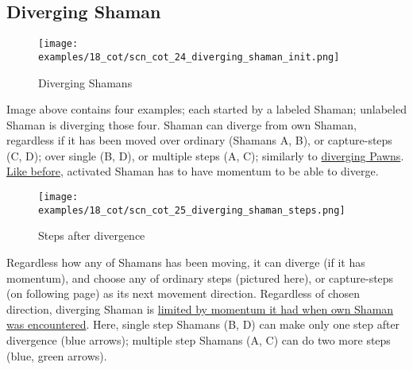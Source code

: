 \subsection*{Diverging Shaman}
\label{sec:Conquest of Tlalocan/Shaman/Movement/Diverging Shaman}

\vspace*{-1.4\baselineskip}
\noindent
\begin{figure}[!h]
\texttt{[image: examples/18\_cot/scn\_cot\_24\_diverging\_shaman\_init.png]}
\vspace*{-1.3\baselineskip}
\caption{Diverging Shamans}
\label{fig:scn_cot_24_diverging_shaman_init}
\end{figure}

\vspace*{-0.5\baselineskip}
Image above contains four examples; each started by a labeled Shaman; unlabeled
Shaman is diverging those four. \newline %
\indent
Shaman can diverge from own Shaman, regardless if it has been moved over ordinary
(Shamans A, B), or capture-steps (C, D); over single (B, D), or multiple steps (A, C);
similarly to \hyperref[fig:scn_cot_13_diverging_pawn_init]{diverging Pawns}.
\hyperref[fig:scn_cot_11_diverging_activated_piece_init]{Like before}, activated
Shaman has to have momentum to be able to diverge.

\clearpage %

\vspace*{-2.1\baselineskip}
\noindent
\begin{figure}[!h]
\texttt{[image: examples/18\_cot/scn\_cot\_25\_diverging\_shaman\_steps.png]}
\vspace*{-1.3\baselineskip}
\caption{Steps after divergence}
\label{fig:scn_cot_25_diverging_shaman_steps}
\end{figure}

\vspace*{-0.5\baselineskip}
Regardless how any of Shamans has been moving, it can diverge (if it has momentum),
and choose any of ordinary steps (pictured here), or capture-steps (on following page)
as its next movement direction. Regardless of chosen direction, diverging Shaman is
\hyperref[fig:scn_cot_10_own_shaman_is_divergent_end]{limited by momentum it had when own Shaman was encountered}. \newline
\indent
Here, single step Shamans (B, D) can make only one step after divergence (blue arrows);
multiple step Shamans (A, C) can do two more steps (blue, green arrows).

